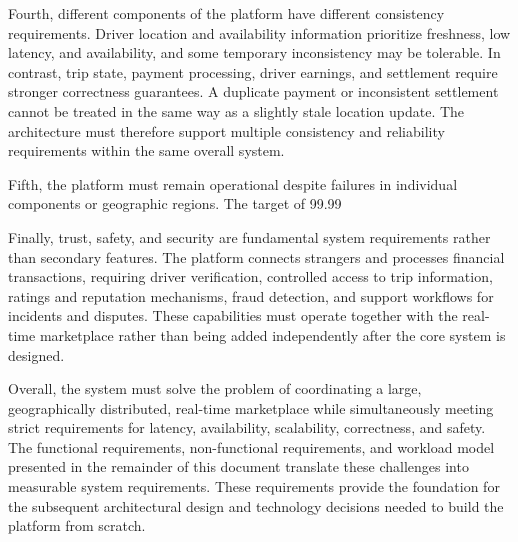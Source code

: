 Fourth, different components of the platform have different consistency requirements. Driver location and availability information prioritize freshness, low latency, and availability, and some temporary inconsistency may be tolerable. In contrast, trip state, payment processing, driver earnings, and settlement require stronger correctness guarantees. A duplicate payment or inconsistent settlement cannot be treated in the same way as a slightly stale location update. The architecture must therefore support multiple consistency and reliability requirements within the same overall system.

Fifth, the platform must remain operational despite failures in individual components or geographic regions. The target of 99.99%

Finally, trust, safety, and security are fundamental system requirements rather than secondary features. The platform connects strangers and processes financial transactions, requiring driver verification, controlled access to trip information, ratings and reputation mechanisms, fraud detection, and support workflows for incidents and disputes. These capabilities must operate together with the real-time marketplace rather than being added independently after the core system is designed.

Overall, the system must solve the problem of coordinating a large, geographically distributed, real-time marketplace while simultaneously meeting strict requirements for latency, availability, scalability, correctness, and safety. The functional requirements, non-functional requirements, and workload model presented in the remainder of this document translate these challenges into measurable system requirements. These requirements provide the foundation for the subsequent architectural design and technology decisions needed to build the platform from scratch.
